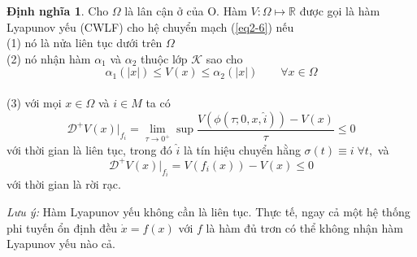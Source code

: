 \documentclass[14pt,a4paper,oneside]{report}		%
\theoremstyle{definition}
\newtheorem{define}[theorem]{Định nghĩa}
\begin{document}
\begin{define} \label{def2-2}
Cho $\Omega$ là lân cận ở của O. Hàm $V:\Omega \mapsto\mathbb{R}$ được gọi là hàm Lyapunov yếu (CWLF) cho hệ chuyển mạch (\ref{eq2-6}) nếu \\
(1) nó là nửa liên tục dưới trên $\Omega$\\
(2) nó nhận hàm $\alpha_1$ và $\alpha_2$ thuộc lớp $\mathcal{K}$ sao cho
$$\alpha_1(|x|)\leq V(x)\leq \alpha_2(|x|)\qquad \forall x\in\Omega$$\\
(3) với mọi $x\in\Omega$ và $i\in M$ ta có
$$\mathcal{D}^+V(x)|_{f_i} = \lim_{\tau \rightarrow 0^+}\sup\frac{V(\phi(\tau;0,x,\widehat{i}))-V(x)}{\tau}\leq 0$$
với thời gian là liên tục, trong đó $\widehat{i}$ là tín hiệu chuyển hằng $\sigma(t)\equiv i\; \forall t,$ và
$$\mathcal{D}^+V(x)|_{f_i}=V(f_i(x))-V(x)\leq 0$$
với thời gian là rời rạc.
\end{define}

\textit{Lưu ý:} Hàm Lyapunov yếu không cần là liên tục. Thực tế, ngay cả một hệ thống phi tuyến ổn định đều $\dot{x}=f(x)$ với $f$ là hàm đủ trơn có thể không nhận hàm Lyapunov yếu nào cả.
\end{document}

